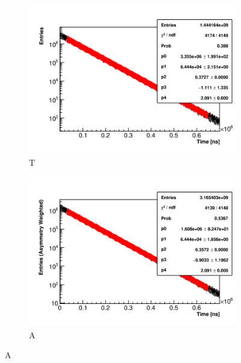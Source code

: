 \begin{figure}[]
\centering
    \begin{subfigure}[t]{0.45\textwidth}
        \centering
        \includegraphics[width=\textwidth]{Example_TMethod_Fit}
        \caption{T}
    \end{subfigure}
    \hspace{1mm}
    \begin{subfigure}[t]{0.45\textwidth}
        \centering
        \includegraphics[width=\textwidth]{Example_AMethod_Fit}
        \caption{A}
    \end{subfigure}%


\end{figure}
